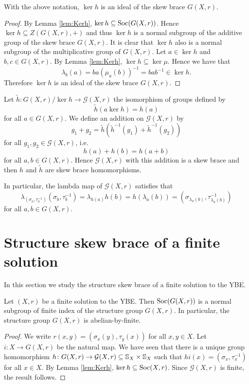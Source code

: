 \begin{lemma}\label{lem:kerhideal}
With the above notation, $\ker h$ is an ideal of the skew brace $G(X,r)$.
\end{lemma}

\begin{proof}
By Lemma \ref{lem:Kerh}, $\ker h\subseteq \operatorname{Soc}(G(X,r))$. Hence $\ker h\subseteq Z(G(X,r),+)$ and thus $\ker h$ is a normal subgroup of the additive group of the skew brace $G(X,r)$. It is clear that $\ker h$ also is a normal subgroup of the multiplicative group of $G(X,r)$. Let $a\in\ker h$ and $b,c\in G(X,r)$. By Lemma \ref{lem:Kerh}, $\ker h\subseteq\ker\mu$. Hence we have that
\[\lambda_b(a)=ba(\mu_a(b))^{-1}=bab^{-1}\in\ker h.\]
Therefore $\ker h$ is an ideal of the skew brace $G(X,r)$.
\end{proof}

Let $\tilde h \colon G(X,r)/\ker h\to \mathcal{G}(X,r)$ the isomorphism of groups defined by 
\[\tilde h(a\ker h)=h(a)\] 
for all $a\in G(X,r)$. We define an addition on $\mathcal{G}(X,r)$ by 
\[ g_1+g_2=\tilde h(\tilde h^{-1}(g_1)+\tilde h^{-1}(g_2))\]
for all $g_1,g_2\in\mathcal{G}(X,r)$, i.e.
\[ h(a)+h(b)=h(a+b)\]
for all $a,b\in G(X,r)$. Hence $\mathcal{G}(X,r)$ with this addition is a skew brace and then $h$ and $\tilde h$ are skew brace homomorphisms.

In particular, the lambda map of $\mathcal{G}(X,r)$ satisfies that  
\[ \lambda_{(\sigma_a,\tau^{-1}_a)}(\sigma_b,\tau^{-1}_b)=\lambda_{h(a)}h(b)=h(\lambda_{a}(b))=(\sigma_{\lambda_a(b)},\tau^{-1}_{\lambda_a(b)})\]
for all $a,b\in G(X,r)$.



\section{Structure skew brace of a finite solution}

In this section we study the structure skew brace of a finite solution to the YBE.

\begin{theorem}\label{thm:abelianbyfinite}
Let $(X,r)$ be a finite solution to the YBE. Then $\operatorname{Soc}(G(X,r))$ is a normal subgroup of finite index of the structure group $G(X,r)$. In particular, the structure group $G(X,r)$ is abelian-by-finite. 
\end{theorem} 

\begin{proof}
We write $r(x,y)=(\sigma_x(y),\tau_y(x))$ for all $x,y\in X$.
Let $i \colon X\to G(X,r)$ be the natural map. We have seen that there is a unique group homomorphism $h \colon G(X,r)\to \mathcal{G}(X,r)\subseteq \mathbb{S}_X\times \mathbb{S}_X$ such that $hi(x)=(\sigma_x,\tau^{-1}_x)$ for all $x\in X$. By Lemma \ref{lem:Kerh}, $\ker h\subseteq \operatorname{Soc}(X,r)$. Since $\mathcal{G}(X,r)$ is finite, the result follows. 
\end{proof}


